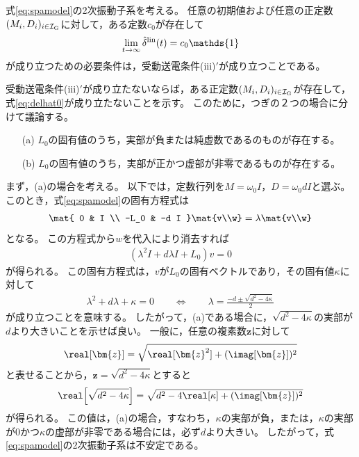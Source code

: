 \documentclass[tombow,dvipdfmx]{corona-a5-1.1}
\begin{document}
\begin{補題}[2次振動子系の定態安定性の必要条件]\label{thm:2ndsys}
式\ref{eq:spamodel}の2次振動子系を考える。
任意の初期値および任意の正定数$(M_i,D_i)_{i \in \mathcal{I}_{\rm G}}$に対して，ある定数$c_0$が存在して
\begin{align}\label{eq:delhat0}
\lim_{t\rightarrow \infty} \hat{\delta}^{\rm lin}(t)= c_0 \mathds{1}
\end{align}
が成り立つための必要条件は，受動送電条件(iii)$'$が成り立つことである。
\end{補題}

\begin{証明}
受動送電条件(iii)$'$が成り立たないならば，ある正定数$(M_i,D_i)_{i \in \mathcal{I}_{\rm G}}$が存在して，式\ref{eq:delhat0}が成り立たないことを示す。
このために，つぎの２つの場合に分けて議論する。
\begin{itemize}
\item[(a)] $L_0$の固有値のうち，実部が負または純虚数であるのものが存在する。
\item[(b)] $L_0$の固有値のうち，実部が正かつ虚部が非零であるものが存在する。
\end{itemize}
まず，(a)の場合を考える。
以下では，定数行列を$M=\omega_0 I$，$D=\omega_0 d I$と選ぶ。
このとき，式\ref{eq:spamodel}の固有方程式は
\begin{align*}
\mat{
0 & I \\
-L_0 & -d I
}
\mat{v\\w}
=
\lambda \mat{v\\w}
\end{align*}
となる。
この方程式から$w$を代入により消去すれば
\begin{align*}
\left(\lambda^2 I +d \lambda I + L_0
\right) v =0
\end{align*}
が得られる。
この固有方程式は，$v$が$L_0$の固有ベクトルであり，その固有値$\kappa$に対して
\begin{align}\label{eq:lamsq}
\lambda^2 + d\lambda +\kappa =0
\qquad
\Longleftrightarrow
\qquad
\lambda = \frac{-d \pm \sqrt{d^2-4\kappa} }{2}
\end{align}
が成り立つことを意味する。
したがって，(a)である場合に，$\sqrt{d^2 - 4\kappa }$の実部が$d$より大きいことを示せば良い。
一般に，任意の複素数$\bm{z}$に対して
\begin{align*}
\real[\bm{z}] = \sqrt{ \real[\bm{z}^2 ] + (\imag[\bm{z}])^2 }
\end{align*}
と表せることから，$\bm{z} = \sqrt{d^2 - 4\kappa }$とすると
\begin{align*}
\real \Bigl[
\sqrt{d^2 - 4\kappa }
\Bigr]
=\sqrt{
d^2 - 4 \real[\kappa]
+
(\imag[ \bm{z} ])^2
}
\end{align*}
が得られる。
この値は，(a)の場合，すなわち，$\kappa$の実部が負，または，$\kappa$の実部が0かつ$\kappa$の虚部が非零である場合には，必ず$d$より大きい。
したがって，式\ref{eq:spamodel}の2次振動子系は不安定である。


\end{証明}
\end{document}
